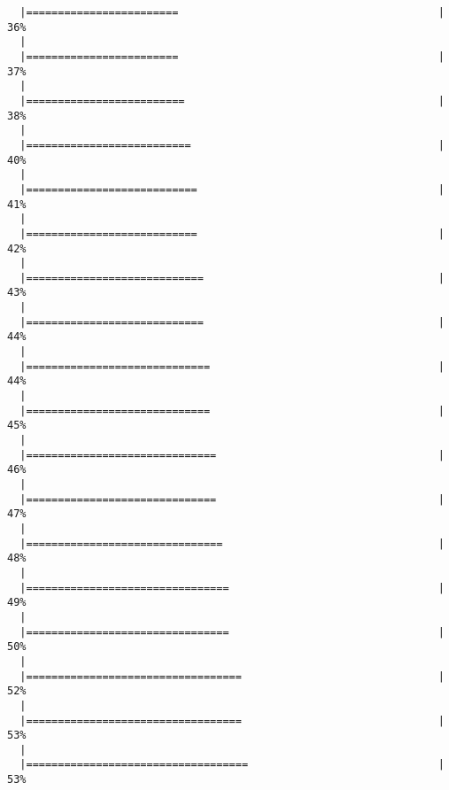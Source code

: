 \documentclass[]{article}
\begin{document}
\begin{verbatim}
  |========================                                         |  36%
  |                                                                       
  |========================                                         |  37%
  |                                                                       
  |=========================                                        |  38%
  |                                                                       
  |==========================                                       |  40%
  |                                                                       
  |===========================                                      |  41%
  |                                                                       
  |===========================                                      |  42%
  |                                                                       
  |============================                                     |  43%
  |                                                                       
  |============================                                     |  44%
  |                                                                       
  |=============================                                    |  44%
  |                                                                       
  |=============================                                    |  45%
  |                                                                       
  |==============================                                   |  46%
  |                                                                       
  |==============================                                   |  47%
  |                                                                       
  |===============================                                  |  48%
  |                                                                       
  |================================                                 |  49%
  |                                                                       
  |================================                                 |  50%
  |                                                                       
  |==================================                               |  52%
  |                                                                       
  |==================================                               |  53%
  |                                                                       
  |===================================                              |  53%

\end{verbatim}
\end{document}
